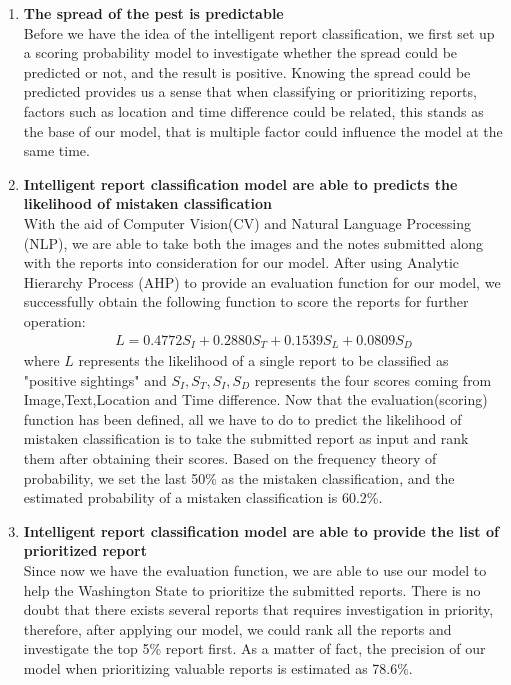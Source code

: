 \documentclass{mcmthesis}
\begin{document}
	\begin{enumerate}
		\item \textbf{The spread of the pest is predictable}\\
		Before we have the idea of the intelligent report classification, we first set up a scoring probability model to investigate whether the spread could be predicted or not, and the result is positive. Knowing the spread could be predicted provides us a sense that when  classifying or prioritizing reports, factors such as location and time difference could be related, this stands as the base of our model, that is multiple factor could influence the model at the same time.
		\item \textbf{Intelligent report classification model are able to predicts the likelihood of mistaken classification} \\
		With the aid of Computer Vision(CV) and Natural Language Processing (NLP), we are able to take both the images and the notes submitted along with the reports into consideration for our model. After using Analytic Hierarchy Process (AHP) to provide an evaluation function for our model, we successfully obtain the following function to score the reports for further operation:
		\begin{align*}
			L = 0.4772S_I + 0.2880S_T + 0.1539S_L + 0.0809S_D
			\label{final}
		\end{align*} 
		where $L$ represents the likelihood of a single report to be classified as "positive sightings"  and $S_I,S_T,S_I,S_D$ represents the four scores coming from Image,Text,Location and Time difference. Now that the evaluation(scoring) function has been defined, all we have to do to predict the likelihood of mistaken classification is to take the submitted report as input and rank them after obtaining their scores. Based on the frequency theory of probability, we set the last 50\% as the mistaken classification, and the estimated probability of a mistaken classification is 60.2\%.
		\item \textbf{Intelligent report classification model are able to provide the list of prioritized report}\\
		Since now we have the evaluation function, we are able to use our model to help the Washington State to prioritize the submitted reports. There is no doubt that there exists several reports that requires investigation in priority, therefore, after applying our model, we could rank all the reports and investigate the top 5\% report first. As a matter of fact, the precision of our model when prioritizing valuable reports is estimated as 78.6\%.

\end{enumerate}
\end{document}
